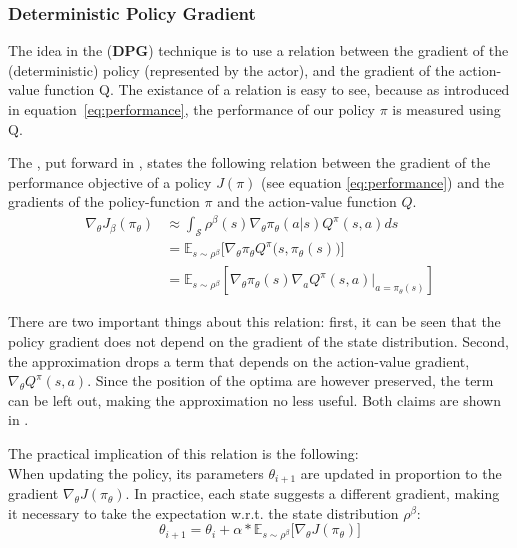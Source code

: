 \subsubsection{Deterministic Policy Gradient}

The idea in the  (\textbf{DPG}) technique is to use a relation between the gradient of the (deterministic) policy (represented by the actor), and the gradient of the action-value function Q. The existance of a relation is easy to see, because as introduced in equation~\ref{eq:performance}, the performance of our policy $\pi$ is measured using Q. 

The , put forward in \cite{silver_deterministic_2014}, states the following relation between the gradient of the performance objective of a policy $J(\pi)$ (see equation \ref{eq:performance}) and the gradients of the policy-function $\pi$ and the action-value function $Q$. 
\begin{align}
	\nabla_{\theta}J_\beta(\pi_\theta) &\approx \int_{\mathcal{S}} \rho^\beta(s) \nabla_\theta \pi_{\theta}(a|s)Q^\pi(s,a) ds \nonumber \\
	    &= \mathds{E}_{s\sim\rho^\beta} \Big[ \nabla_\theta \pi_\theta Q^\pi \big(s,\pi_\theta(s)\big)   \Big] \nonumber \\
		&= \mathds{E}_{s\sim\rho^\beta} \left[  \nabla_\theta \pi_{\theta}(s) \nabla_a Q^\pi(s,a) \big|_{a=\pi_\theta(s)} \right]  \label{eq:dpg}
\end{align}
\begin{flushright}
	\small There are two important things about this relation: first, it can be seen that the policy gradient does not depend on the gradient of the state distribution. Second, the approximation drops a term that depends on the action-value gradient, $\nabla_{\theta} Q^\pi(s,a)$. Since the position of the optima are however preserved, the term can be left  out, making the approximation no less useful. Both claims are shown in \cite{silver_deterministic_2014}.\\ 
\end{flushright}

\noindent The practical implication of this relation is the following:\\
\noindent When updating the policy, its parameters $\theta_{i+1}$ are updated in proportion to the gradient $\nabla_{\theta}J(\pi_\theta)$. In practice, each state suggests a different gradient, making it necessary to take the expectation w.r.t. the state distribution $\rho^\beta$: 
\begin{equation*}
	\theta_{i+1} = \theta_i + \alpha * \mathds{E}_{s\sim\rho^\beta} \big[ \nabla_{\theta}J(\pi_\theta) \big]
\end{equation*}

